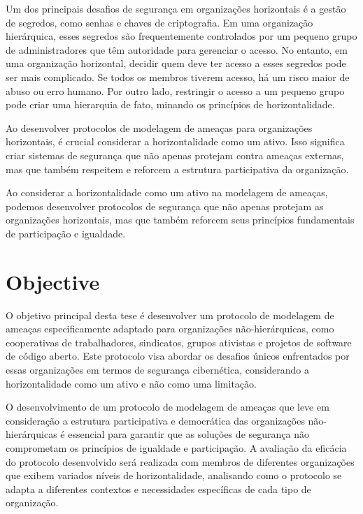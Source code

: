 Um dos principais desafios de segurança em organizações horizontais é a gestão
de segredos, como senhas e chaves de criptografia. Em uma organização
hierárquica, esses segredos são frequentemente controlados por um pequeno grupo de
administradores que têm autoridade para gerenciar o acesso. No entanto, em uma organização
horizontal, decidir quem deve ter acesso a esses segredos pode ser mais complicado. Se
todos os membros tiverem acesso, há um risco maior de abuso ou erro humano. Por
outro lado, restringir o acesso a um pequeno grupo pode criar uma hierarquia de
fato, minando os princípios de horizontalidade.

Ao desenvolver protocolos de modelagem de ameaças para organizações
horizontais, é crucial considerar a horizontalidade como um ativo. Isso significa criar
sistemas de segurança que não apenas protejam contra ameaças externas, mas que também
respeitem e reforcem a estrutura participativa da organização.

Ao considerar a horizontalidade como um ativo na modelagem de ameaças, podemos
desenvolver protocolos de segurança que não apenas protejam as organizações horizontais,
mas que também reforcem seus princípios fundamentais de participação e igualdade.

\section{Objective}
\label{sec:objective}

O objetivo principal desta tese é desenvolver um protocolo de modelagem de
ameaças especificamente adaptado para organizações não-hierárquicas, como cooperativas
de trabalhadores, sindicatos, grupos ativistas e projetos de software de código
aberto. Este protocolo visa abordar os desafios únicos enfrentados por essas
organizações em termos de segurança cibernética, considerando a horizontalidade como um
ativo e não como uma limitação. 

O desenvolvimento de um protocolo de modelagem de ameaças que leve em
consideração a estrutura participativa e democrática das organizações não-hierárquicas é
essencial para garantir que as soluções de segurança não comprometam os princípios de
igualdade e participação. A avaliação da eficácia do protocolo desenvolvido será
realizada com membros de diferentes organizações que exibem variados níveis de
horizontalidade, analisando como o protocolo se adapta a diferentes contextos e necessidades
específicas de cada tipo de organização. 

